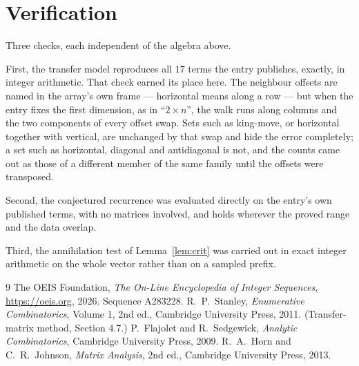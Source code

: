 \documentclass[11pt,a4paper]{article}
\theoremstyle{plain}
\theoremstyle{definition}
\begin{document}
\section{Verification}

Three checks, each independent of the algebra above.

First, the transfer model reproduces all $17$ terms the entry publishes, exactly, in
integer arithmetic. That check earned its place here. The neighbour offsets are named in the
array's own frame --- horizontal means along a row --- but when the entry fixes the first
dimension, as in ``$2\times n$'', the walk runs along columns and the two components of every
offset swap. Sets such as king-move, or horizontal together with vertical, are unchanged by
that swap and hide the error completely; a set such as horizontal, diagonal and antidiagonal
is not, and the counts came out as those of a different member of the same family until the
offsets were transposed.

Second, the conjectured recurrence was evaluated directly on the entry's own published terms,
with no matrices involved, and holds wherever the proved range and the data overlap.

Third, the annihilation test of Lemma~\ref{lem:crit} was carried out in exact integer
arithmetic on the whole vector rather than on a sampled prefix.

\begin{thebibliography}{9}
 The OEIS Foundation, \emph{The On-Line Encyclopedia of Integer
Sequences}, \url{https://oeis.org}, 2026. Sequence A283228.
 R.~P.~Stanley, \emph{Enumerative Combinatorics}, Volume 1, 2nd ed.,
Cambridge University Press, 2011. (Transfer-matrix method, Section 4.7.)
 P.~Flajolet and R.~Sedgewick, \emph{Analytic Combinatorics}, Cambridge
University Press, 2009.
 R.~A.~Horn and C.~R.~Johnson, \emph{Matrix Analysis}, 2nd ed., Cambridge
University Press, 2013.
\end{thebibliography}
\end{document}
